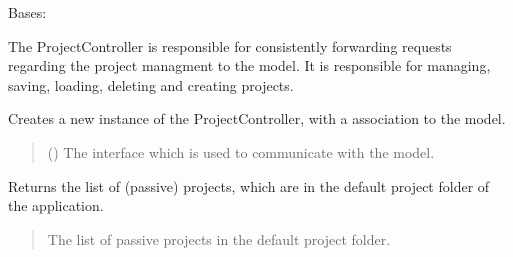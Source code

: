 \documentclass[letterpaper,10pt,english]{sphinxmanual}
\begin{document}
\begin{fulllineitems}
\label{\detokenize{apidoc/src.osm_configurator.control:src.osm_configurator.control.project_controller.ProjectController}}
\pysigstartsignatures
{}
\pysigstopsignatures
\sphinxAtStartPar
Bases: 

\sphinxAtStartPar
The ProjectController is responsible for consistently forwarding requests regarding the project managment to the model.
It is responsible for managing, saving, loading, deleting and creating projects.

\begin{fulllineitems}
\label{\detokenize{apidoc/src.osm_configurator.control:src.osm_configurator.control.project_controller.ProjectController.__init__}}
\pysigstartsignatures
{}
\pysigstopsignatures
\sphinxAtStartPar
Creates a new instance of the ProjectController, with a association to the model.
\begin{quote}\begin{description}
\sphinxAtStartPar
{} ({\hyperref[\detokenize{apidoc/src.osm_configurator.model.application:src.osm_configurator.model.application.application_interface.IApplication}]{}}) \textendash{} The interface which is used to communicate with the model.

\end{description}\end{quote}

\end{fulllineitems}


\begin{fulllineitems}
\label{\detokenize{apidoc/src.osm_configurator.control:src.osm_configurator.control.project_controller.ProjectController.get_list_of_passive_projects}}
\pysigstartsignatures
{}
\pysigstopsignatures
\sphinxAtStartPar
Returns the list of (passive) projects, which are in the default project folder of the application.
\begin{quote}\begin{description}
\sphinxAtStartPar
The list of passive projects in the default project folder.


\end{description}
\end{quote}
\end{fulllineitems}
\end{fulllineitems}
\end{document}
